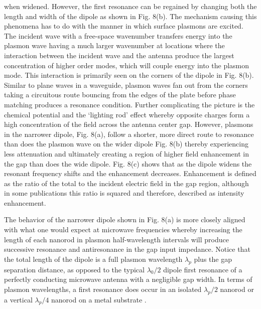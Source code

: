 \documentclass[11pt]{article}
\begin{document}

when widened. However, the first resonance can be regained by changing both the length and width of the dipole as shown in Fig. 8(b). The mechanism causing this phenomena has to do with the manner in which surface plasmons are excited. The incident wave with a free-space wavenumber transfers energy into the plasmon wave having a much larger wavenumber at locations where the interaction between the incident wave and the antenna produce the largest concentration of higher order modes, which will couple energy into the plasmon mode. This interaction is primarily seen on the corners of the dipole in Fig. 8(b). Similar to plane waves in a waveguide, plasmon waves fan out from the corners taking a circuitous route bouncing from the edges of the plate before phase matching produces a resonance condition. Further complicating the picture is the chemical potential and the `lighting rod' effect whereby opposite charges form a high concentration of the field across the antenna center gap. However, plasmons in the narrower dipole, Fig. 8(a), follow a shorter, more direct route to resonance than does the plasmon wave on the wider dipole Fig. 8(b) thereby experiencing less attenuation and ultimately creating a region of higher field enhancement in the gap than does the wide dipole. Fig. 8(c) shows that as the dipole widens the resonant frequency shifts and the enhancement decreases.  Enhancement is defined as the ratio of the total to the incident electric field in the gap region, although in some publications this ratio is squared and therefore, described as intensity enhancement.

The behavior of the narrower dipole shown in Fig. 8(a) is more closely aligned with what one would expect at microwave frequencies whereby increasing the length of each nanorod in plasmon half-wavelength intervals will produce successive resonance and antiresonance in the gap input impedance. Notice that the total length of the dipole is a full plasmon wavelength $\lambda_p$ plus the gap separation distance, as opposed to the typical $\lambda_0/2$ dipole first resonance of a perfectly conducting microwave antenna with a negligible gap width. In terms of plasmon wavelengths, a first resonance does occur in an isolated $\lambda_p/2$ nanorod or a vertical $\lambda_p/4$ nanorod on a metal substrate \cite{Taminiau2007}.
\end{document}
